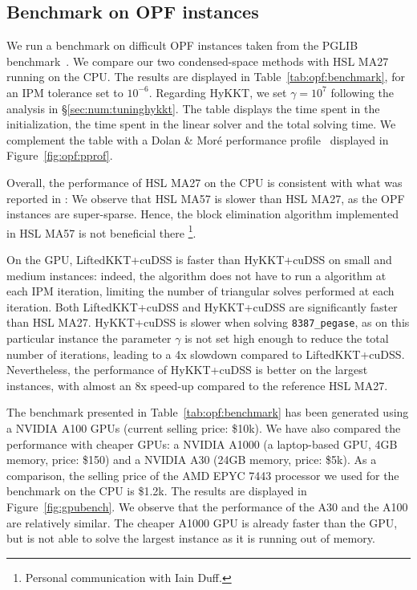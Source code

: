 \subsection{Benchmark on OPF instances}
\label{sec:num:opf}
We run a benchmark on difficult OPF instances taken
from the PGLIB benchmark~\cite{babaeinejadsarookolaee2019power}.
We compare our two condensed-space methods with HSL MA27 running
on the CPU. The results are displayed in Table~\ref{tab:opf:benchmark},
for an IPM tolerance set to $10^{-6}$.
Regarding HyKKT, we set $\gamma = 10^7$ following the analysis in \S\ref{sec:num:tuninghykkt}.
The table displays the time spent in the initialization, the time spent in the linear solver and the total
solving time.
We complement the table with a Dolan \& Moré performance profile~\cite{dolan2002benchmarking} displayed
in Figure~\ref{fig:opf:pprof}.

Overall, the performance of HSL MA27 on the CPU is consistent with what was reported
in \cite{babaeinejadsarookolaee2019power}: We observe that HSL MA57 is slower
than HSL MA27, as the OPF instances are super-sparse.
Hence, the block elimination algorithm implemented in HSL MA57 is not beneficial there
\footnote{Personal communication with Iain Duff.}.

On the GPU, LiftedKKT+cuDSS is faster than HyKKT+cuDSS on small and medium instances: indeed, the algorithm
does not have to run a \CG algorithm at each IPM iteration, limiting the number
of triangular solves performed at each iteration.
Both LiftedKKT+cuDSS and HyKKT+cuDSS are significantly faster than HSL MA27.
HyKKT+cuDSS is slower when solving {\tt 8387\_pegase}, as on this particular instance
the parameter $\gamma$ is not set high enough to reduce the
total number of \CG iterations, leading to a 4x slowdown compared to LiftedKKT+cuDSS.
Nevertheless, the performance of HyKKT+cuDSS is better on the largest instances,
with almost an 8x speed-up compared to the reference HSL MA27.

The benchmark presented in Table~\ref{tab:opf:benchmark} has been generated using a
NVIDIA A100 GPUs (current selling price: \$10k). We have also compared the performance
with cheaper GPUs: a NVIDIA A1000 (a laptop-based GPU, 4GB memory, price: \$150) and a NVIDIA A30
(24GB memory, price: \$5k).
As a comparison, the selling price of the AMD EPYC
7443 processor we used for the benchmark on the CPU is \$1.2k. The results are
displayed in Figure~\ref{fig:gpubench}. We observe that the performance of the A30
and the A100 are relatively similar. The cheaper A1000 GPU is already faster
than the GPU, but is not able to solve the largest instance as it is running out of memory.

